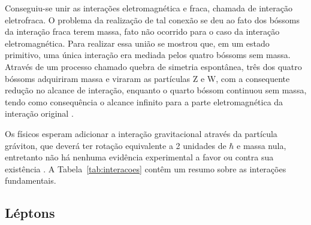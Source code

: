 \begin{table}
\centering
{}
\caption{As quatro interações fundamentais. A intensidade relativa se dá em
relação a interação forte. Adaptado de \cite{Beiser}.}
\label{tab:interacoes}
\end{table}

Conseguiu-se unir as interações eletromagnética e fraca, chamada de interação
eletrofraca. O problema da realização de tal conexão se deu ao fato dos
bóssoms da interação fraca terem massa, fato não ocorrido para o caso da
interação eletromagnética. Para realizar essa união se mostrou que, em um
estado primitivo, uma única interação era mediada pelos quatro bóssoms sem massa.
Através de um processo chamado quebra de simetria espontânea, três dos quatro
bóssoms adquiriram massa e viraram as partículas Z e W, com a consequente
redução no alcance de interação, enquanto o quarto bóssom continuou sem massa,
tendo como consequência o alcance infinito para a parte eletromagnética da
interação original \cite{Beiser}.


Os físicos esperam adicionar a interação gravitacional
através da partícula gráviton, que deverá ter rotação equivalente a 2
unidades de $\hbar$ e massa nula, entretanto não há nenhuma evidência 
experimental a favor ou contra sua existência \cite{Beiser}.
A Tabela~\ref{tab:interacoes} contêm um resumo sobre as interações
fundamentais.

\subsection{Léptons}
\label{ssec:leptons}

